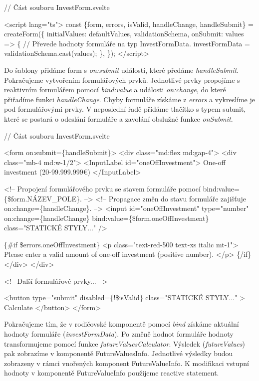 \begin{prog}
// Část souboru InvestForm.svelte

<script lang="ts">
  const \{form, errors, isValid, handleChange, handleSubmit\} = createForm(\{
    initialValues: defaultValues,
    validationSchema,
    onSubmit: values => \{
      // Převede hodnoty formuláře na typ InvestFormData.
      investFormData = validationSchema.cast(values);
    \},
  \});
</script>
\end{prog}

Do šablony přidáme form s \emph{on:submit} událostí, které předáme \emph{handleSubmit}. Pokračujeme vytvořením formulářových prvků. 
Jednotlivé prvky propojíme s reaktivním formulářem pomocí \emph{bind:value} a události \emph{on:change}, do které přiřadíme funkci \emph{handleChange}. 
Chyby formuláře získáme z \emph{errors} a vykreslíme je pod formulářovými prvky. 
V neposlední řadě přidáme tlačítko s typem submit, které se postará o odeslání formuláře a zavolání obslužné funkce \emph{onSubmit}.

\begin{prog}
// Část souboru InvestForm.svelte

<form on:submit=\{handleSubmit\}>
  <div class="md:flex md:gap-4">
    <div class="mb-4 md:w-1/2">
      <InputLabel id="oneOffInvestment">
        One-off investment (20-99.999.999€)
      </InputLabel>

      <!-- Propojení formulářového prvku se stavem formuláře
        pomocí bind:value=\{\$form.NÁZEV_POLE\}. -->
      <!-- Propagace změn do stavu formuláře 
        zajišťuje on:change=\{handleChange\}. -->
      <input
        id="oneOffInvestment"
        type="number"
        on:change=\{handleChange\}
        bind:value=\{\$form.oneOffInvestment\}
        class="STATICKÉ STYLY..."
      />

      \{#if \$errors.oneOffInvestment\}
        <p class="text-red-500 text-xs italic mt-1">
          Please enter a valid amount of one-off investment (positive number).
        </p>
      \{/if\}
    </div>
  </div>

  <!-- Další formulářové prvky... -->

  <button
    type="submit"
    disabled=\{!\$isValid\}
    class="STATICKÉ STYLY..."
  >
    Calculate
  </button>
</form>
\end{prog}

Pokračujeme tím, že v rodičovské komponentě pomocí \emph{bind} získáme aktuální hodnoty formuláře (\emph{investFormData}). Po změně hodnot formuláře hodnoty transformujeme pomocí funkce \emph{futureValuesCalculator}. 
Výsledek (\emph{futureValues}) pak zobrazíme v komponentě FutureValuesInfo. Jednotlivé výsledky budou zobrazeny v rámci vnořených komponent FutureValueInfo. 
K modifikaci vstupní hodnoty v komponentě FutureValueInfo použijeme reactive statement.

